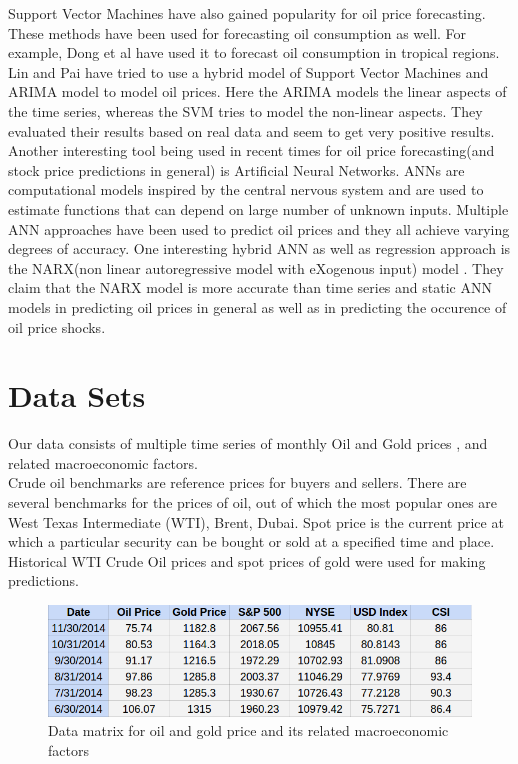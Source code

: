 \documentclass[runningheads]{llncs}
\begin{document}
\noindent Support Vector Machines have also gained popularity for oil price forecasting. These methods have been used for forecasting oil consumption as well. For example, Dong et al \cite{dongbing} have used it to forecast oil consumption in tropical regions. Lin and Pai  \cite{linpai} have tried to use a hybrid model of Support Vector Machines and ARIMA model to model oil prices. Here the ARIMA models the linear aspects of the time series, whereas the SVM tries to model the non-linear aspects. They evaluated their results based on real data and seem to get very positive results.\\

\noindent Another interesting tool being used in recent times for oil price forecasting(and stock price predictions in general) is Artificial Neural Networks. ANNs are computational models inspired by the central nervous system and are used to estimate functions that can depend on large number of unknown inputs. Multiple ANN approaches have been used to predict oil prices and they all achieve varying degrees of accuracy. One interesting hybrid ANN as well as regression approach is the NARX(non linear autoregressive model with eXogenous input) model \cite{oil-ann}. They claim that the NARX model is more accurate than time series and static ANN models in predicting oil prices in general as well as in predicting the occurence of oil price shocks.\\
   
\newpage

\section{Data Sets}

\noindent Our data consists of multiple time series of monthly Oil and Gold prices \cite{quandal}, and related macroeconomic factors.\\

\noindent Crude oil benchmarks are reference prices for buyers and sellers. There are several benchmarks for the prices of oil, out of which the most popular ones are West Texas Intermediate (WTI), Brent, Dubai. 
Spot price is the current price at which a particular security can be bought or sold at a specified time and place. \\
Historical WTI Crude Oil prices and spot prices of gold were used for making predictions.

\begin{figure}
\centering
\includegraphics[width=\textwidth]{DataMatrices.png}
\caption{Data matrix for oil and gold price and its related macroeconomic factors}
\label{fig:DataMatrices.png}
\end{figure}
\end{document}
